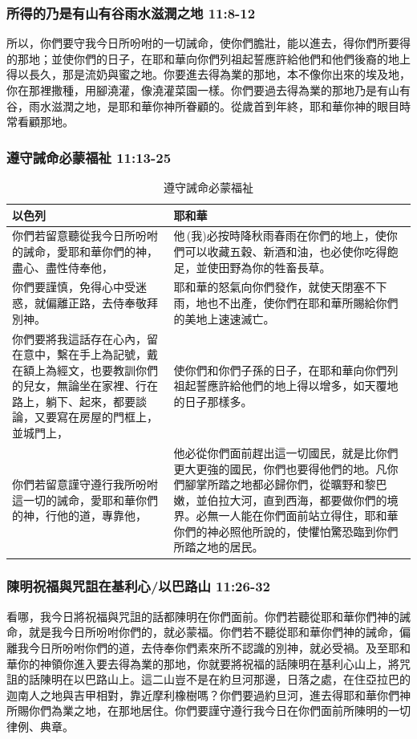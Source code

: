 \subsubsection{所得的乃是有山有谷雨水滋潤之地 11:8-12}
所以，你們要守我今日所吩咐的一切誡命，使你們膽壯，能以進去，得你們所要得的那地；並使你們的日子，在耶和華向你們列祖起誓應許給他們和他們後裔的地上得以長久，那是流奶與蜜之地。你要進去得為業的那地，本不像你出來的埃及地，你在那裡撒種，用腳澆灌，像澆灌菜園一樣。你們要過去得為業的那地乃是有山有谷，雨水滋潤之地，是耶和華你神所眷顧的。從歲首到年終，耶和華你神的眼目時常看顧那地。

\subsubsection{遵守誡命必蒙福祉 11:13-25}
\begin{table}[H]
\begin{center}
\begin{tabular}{ p{7.5cm}|p{9.5cm} } \toprule
 以色列&耶和華 \\\hline
你們若留意聽從我今日所吩咐的誡命，愛耶和華你們的神，盡心、盡性侍奉他，&
他 (我)必按時降秋雨春雨在你們的地上，使你們可以收藏五穀、新酒和油，也必使你吃得飽足，並使田野為你的牲畜長草。\\\hline
你們要謹慎，免得心中受迷惑，就偏離正路，去侍奉敬拜別神。&耶和華的怒氣向你們發作，就使天閉塞不下雨，地也不出產，使你們在耶和華所賜給你們的美地上速速滅亡。\\ \hline
你們要將我這話存在心內，留在意中，繫在手上為記號，戴在額上為經文，也要教訓你們的兒女，無論坐在家裡、行在路上，躺下、起來，都要談論，又要寫在房屋的門框上，並城門上，&使你們和你們子孫的日子，在耶和華向你們列祖起誓應許給他們的地上得以增多，如天覆地的日子那樣多。\\\hline
你們若留意謹守遵行我所吩咐這一切的誡命，愛耶和華你們的神，行他的道，專靠他，&他必從你們面前趕出這一切國民，就是比你們更大更強的國民，你們也要得他們的地。凡你們腳掌所踏之地都必歸你們，從曠野和黎巴嫩，並伯拉大河，直到西海，都要做你們的境界。必無一人能在你們面前站立得住，耶和華你們的神必照他所說的，使懼怕驚恐臨到你們所踏之地的居民。\\ \hline
\end{tabular}
\end{center}
\caption{遵守誡命必蒙福祉}
\end{table}
 
\subsubsection{陳明祝福與咒詛在基利心/以巴路山 11:26-32}
看哪，我今日將祝福與咒詛的話都陳明在你們面前。你們若聽從耶和華你們神的誡命，就是我今日所吩咐你們的，就必蒙福。你們若不聽從耶和華你們神的誡命，偏離我今日所吩咐你們的道，去侍奉你們素來所不認識的別神，就必受禍。及至耶和華你的神領你進入要去得為業的那地，你就要將祝福的話陳明在基利心山上，將咒詛的話陳明在以巴路山上。這二山豈不是在約旦河那邊，日落之處，在住亞拉巴的迦南人之地與吉甲相對，靠近摩利橡樹嗎？你們要過約旦河，進去得耶和華你們神所賜你們為業之地，在那地居住。你們要謹守遵行我今日在你們面前所陳明的一切律例、典章。

